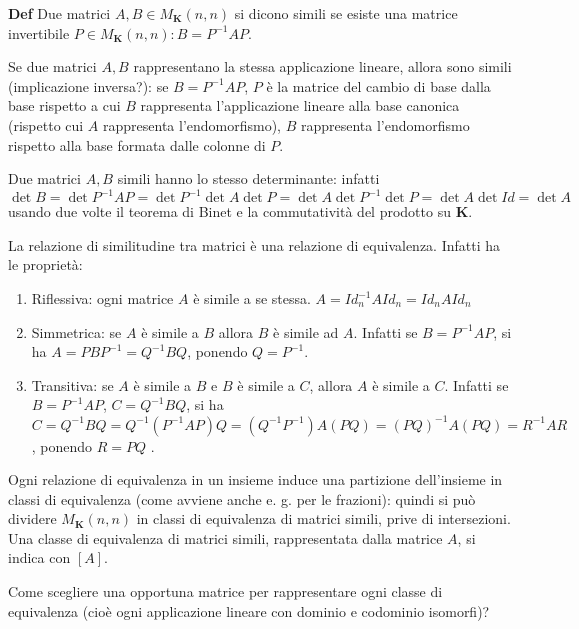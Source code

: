 \documentclass{article}
\begin{document}
\textbf{Def} Due matrici $A,B\in M_{\mathbf{K}}\left( n,n\right) $ si dicono
simili se esiste una matrice invertibile $P\in M_{\mathbf{K}}\left(
n,n\right) :B=P^{-1}AP$.

Se due matrici $A,B$ rappresentano la stessa applicazione lineare, allora
sono simili (implicazione inversa?): se $B=P^{-1}AP$, $P$ \`{e} la matrice
del cambio di base dalla base rispetto a cui $B$ rappresenta l'applicazione
lineare alla base canonica (rispetto cui $A$ rappresenta l'endomorfismo), $B$
rappresenta l'endomorfismo rispetto alla base formata dalle colonne di $P$.

Due matrici $A,B$ simili hanno lo stesso determinante: infatti $\det B=\det
P^{-1}AP=\det P^{-1}\det A\det P=\det A\det P^{-1}\det P=\det A\det Id=\det
A $ usando due volte il teorema di Binet e la commutativit\`{a} del prodotto
su $\mathbf{K}$.

La relazione di similitudine tra matrici \`{e} una relazione di equivalenza.
Infatti ha le propriet\`{a}:

\begin{enumerate}
\item Riflessiva: ogni matrice $A$ \`{e} simile a se stessa. $%
A=Id_{n}^{-1}AId_{n}=Id_{n}AId_{n}$

\item Simmetrica: se $A$ \`{e} simile a $B$ allora $B$ \`{e} simile ad $A$.
Infatti se $B=P^{-1}AP$, si ha $A=PBP^{-1}=Q^{-1}BQ$, ponendo $Q=P^{-1}$.

\item Transitiva: se $A$ \`{e} simile a $B$ e $B$ \`{e} simile a $C$, allora 
$A$ \`{e} simile a $C$. Infatti se $B=P^{-1}AP$, $C=Q^{-1}BQ$, si ha $%
C=Q^{-1}BQ=Q^{-1}\left( P^{-1}AP\right) Q=\left( Q^{-1}P^{-1}\right) A\left(
PQ\right) =\left( PQ\right) ^{-1}A\left( PQ\right) =R^{-1}AR$, ponendo $R=PQ$%
.
\end{enumerate}

Ogni relazione di equivalenza in un insieme induce una partizione
dell'insieme in classi di equivalenza (come avviene anche e. g. per le
frazioni): quindi si pu\`{o} dividere $M_{\mathbf{K}}\left( n,n\right) $ in
classi di equivalenza di matrici simili, prive di intersezioni. Una classe
di equivalenza di matrici simili, rappresentata dalla matrice $A$, si indica
con $\left[ A\right] $.

Come scegliere una opportuna matrice per rappresentare ogni classe di
equivalenza (cio\`{e} ogni applicazione lineare con dominio e codominio
isomorfi)?
\end{document}
